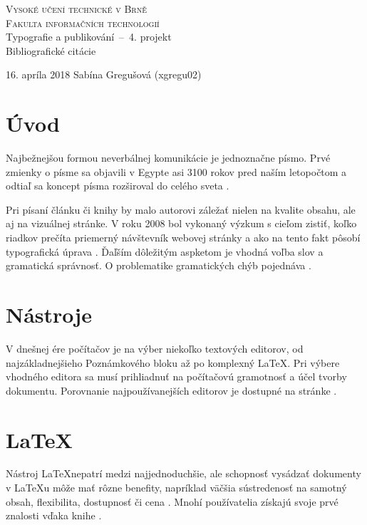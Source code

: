 \documentclass[a4paper, 11pt]{article}
\begin{document}
\begin{titlepage}
\begin{center}

\textsc{{\Huge Vysoké učení technické v Brně}\\
{\Huge Fakulta informačních technologií}}\\
\LARGE Typografie a publikování \,--\, 4. projekt\\
{\huge Bibliografické citácie}
\end{center}
{\LARGE 16. apríla 2018 \hfill
Sabína Gregušová (xgregu02)}
\end{titlepage}

\section{Úvod}
Najbežnejšou formou neverbálnej komunikácie je jednoznačne písmo. Prvé zmienky o písme sa objavili v Egypte asi 3100 rokov pred naším letopočtom a odtiaľ sa koncept písma rozširoval do celého sveta \cite{Story2007}.

Pri písaní článku či knihy by malo autorovi záležať nielen na kvalite obsahu, ale aj na vizuálnej stránke. V roku 2008 bol vykonaný výzkum s cieľom zistiť, koľko riadkov prečíta priemerný návštevník webovej stránky a ako na tento fakt pôsobí typografická úprava \cite{vyskum2008}. Ďaľším dôležitým aspketom je vhodná voľba slov a gramatická správnosť. O problematike gramatických chýb pojednáva \cite{Pospisilova2016}.

\section{Nástroje}
V dnešnej ére počítačov je na výber niekoľko textových editorov, od najzákladnejšieho Poznámkového bloku až po komplexný \LaTeX. Pri výbere vhodného editora sa musí prihliadnuť na počítačovú gramotnosť a účel tvorby dokumentu. Porovnanie najpoužívanejších editorov je dostupné na stránke \cite{porovnanie2007}.

\section{\LaTeX}
Nástroj \LaTeX nepatrí medzi najjednoduchšie, ale schopnosť vysádzať dokumenty v \LaTeX u môže mať rôzne benefity, napríklad väčšia sústredenosť na samotný obsah, flexibilita, dostupnosť či cena \cite{online2011}. Mnohí používatelia získajú svoje prvé znalosti vďaka knihe \cite{Rybicka2003}.
\end{document}

